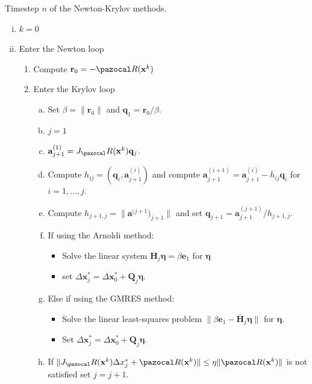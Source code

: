 \begin{framedbox}[htbp]
  \caption{Timestep \(n\) of the Newton-Krylov methods.}
  \label{box:newton_krylov}
  \begin{center}
    \begin{minipage}{0.9\textwidth}
    \begin{enumerate}[(i)]
    \item \(k=0\)
    \item Enter the Newton loop
    \begin{enumerate}[(1)]
      \item Compute \(\mathbf r_0 = -\pazocal R(\mathbf x^k)\)
      \item Enter the Krylov loop
      \begin{enumerate}[(a)]
        \item Set \(\beta = \|\mathbf r_0\|\) and \(\mathbf q_1 = \mathbf r_0/\beta\).
        \item \(j=1\)
        \item \(\mathbf a^{(1)}_{j+1} = J_\pazocal R(\mathbf x^k) \mathbf q_j\).
        \item Compute \(h_{ij}=(\mathbf q_i, \mathbf a^{(i)}_{j+1})\) and compute \(\mathbf a^{(i+1)}_{j+1} = \mathbf a^{(i)}_{j+1} - h_{ij} \mathbf q_i\) for \(i=1,\dots,j\).
        \item Compute \(h_{j+1,j}=\|\mathbf a^{(j+1})_{j+1}\|\) and set \(\mathbf q_{j+1} = \mathbf a^{(j+1)}_{j+1}/h_{j+1,j}\).  
        \item If using the Arnoldi method:
        \begin{itemize}   
          \item Solve the linear system \(\mathbf H_j \boldsymbol{\eta} = \beta \mathbf e_1\) for \(\boldsymbol{\eta}\)
          \item set \(\Delta \mathbf x^*_j  =\Delta \mathbf x^*_0 + \mathbf Q_j\boldsymbol \eta\).
        \end{itemize}   
        \item Else if using the GMRES method:
        \begin{itemize}   
          \item Solve the linear least-squares problem \(\|\beta\mathbf e_1 -\bar{\mathbf H}_j \boldsymbol{\eta}\|\) for \(\boldsymbol{\eta}\).
          \item Set \(\Delta \mathbf x^*_j  =\Delta \mathbf x^*_0 + \mathbf Q_j\boldsymbol \eta\).
        \end{itemize}   
        \item If \(\|J_\pazocal R(\mathbf x^k) \Delta x^*_j+ \pazocal R(\mathbf x^k)\| \leq \eta\|\pazocal R(\mathbf x^k)\|\) is not satisfied set \(j=j+1\).

\end{enumerate}
\end{enumerate}
\end{enumerate}
\end{minipage}
\end{center}
\end{framedbox}
